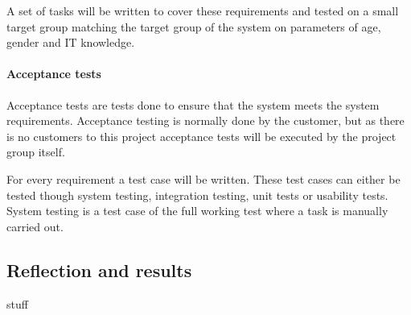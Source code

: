 \documentclass[../report.tex]{subfiles}
\begin{document}
A set of tasks will be written to cover these requirements and tested on a small target group matching the target group of the system on parameters of age, gender and IT knowledge.

\paragraph{Acceptance tests}
Acceptance tests are tests done to ensure that the system meets the system requirements. Acceptance testing is normally done by the customer, but as there is no customers to this project acceptance tests will be executed by the project group itself.

For every requirement a test case will be written. These test cases can either be tested though system testing, integration testing, unit tests or usability tests. System testing is a test case of the full working test where a task is manually carried out. 

\subsection{Reflection and results}
stuff
\end{document}

